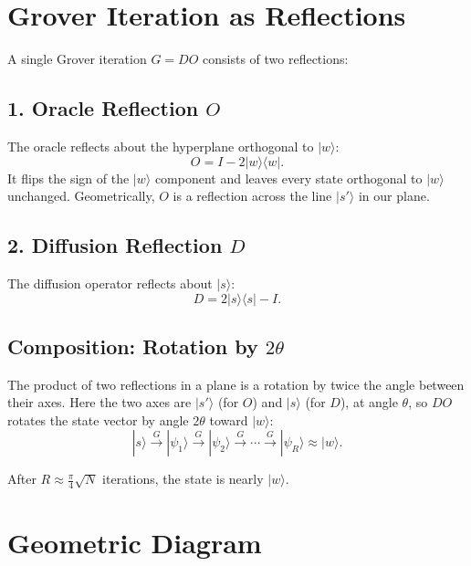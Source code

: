 \documentclass[a4paper,11pt]{article}
\providecommand{\ket}[1]{|{#1}\rangle}
\providecommand{\bra}[1]{\langle{#1}|}
\begin{document}
\section*{Grover Iteration as Reflections}

A single Grover iteration $G = DO$ consists of two reflections:

\subsection*{1. Oracle Reflection $O$}

The oracle reflects about the hyperplane orthogonal to $\ket{w}$:
\[
O = I - 2\ket{w}\bra{w}.
\]
It flips the sign of the $\ket{w}$ component and leaves every state orthogonal to $\ket{w}$ unchanged.
Geometrically, $O$ is a reflection across the line $\ket{s'}$ in our plane.

\subsection*{2. Diffusion Reflection $D$}

The diffusion operator reflects about $\ket{s}$:
\[
D = 2\ket{s}\bra{s} - I.
\]

\subsection*{Composition: Rotation by $2\theta$}

The product of two reflections in a plane is a rotation by twice the angle between their axes. Here the two axes are $\ket{s'}$ (for $O$) and $\ket{s}$ (for $D$), at angle $\theta$, so $DO$ rotates the state vector by angle $2\theta$ toward $\ket{w}$:
\[
\ket{s} \xrightarrow{G} \ket{\psi_1} \xrightarrow{G} \ket{\psi_2} \xrightarrow{G} \cdots \xrightarrow{G} \ket{\psi_R} \approx \ket{w}.
\]

After $R\approx\frac{\pi}{4}\sqrt{N}$ iterations, the state is nearly $\ket{w}$.

\section*{Geometric Diagram}
\end{document}
